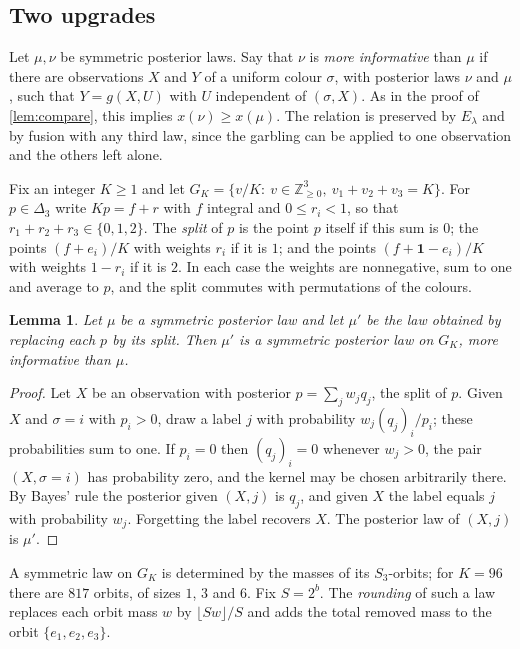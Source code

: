 \documentclass[11pt]{amsart}
\newtheorem{lemma}[theorem]{Lemma}
\theoremstyle{definition}
\theoremstyle{remark}
\newcommand{\one}{\mathbf{1}}
\newcommand{\Simp}{\Delta_3}
\begin{document}
\subsection{Two upgrades}
Let $\mu,\nu$ be symmetric posterior laws. Say that $\nu$ is \emph{more informative} than $\mu$ if there are
observations $X$ and $Y$ of a uniform colour $\sigma$, with posterior laws $\nu$ and $\mu$, such that
$Y=g(X,U)$ with $U$ independent of $(\sigma,X)$. As in the proof of \cref{lem:compare}, this implies
$x(\nu)\ge x(\mu)$. The relation is preserved by $E_\lambda$ and by fusion with any third law, since the garbling
can be applied to one observation and the others left alone.

Fix an integer $K\ge1$ and let $G_K=\{v/K:\ v\in\mathbb Z_{\ge0}^3,\ v_1+v_2+v_3=K\}$. For $p\in\Simp$ write
$Kp=f+r$ with $f$ integral and $0\le r_i<1$, so that $r_1+r_2+r_3\in\{0,1,2\}$. The \emph{split} of $p$ is the
point $p$ itself if this sum is $0$; the points $(f+e_i)/K$ with weights $r_i$ if it is $1$; and the points
$(f+\one-e_i)/K$ with weights $1-r_i$ if it is $2$. In each case the weights are nonnegative, sum to one and
average to $p$, and the split commutes with permutations of the colours.

\begin{lemma}\label{lem:split}
Let $\mu$ be a symmetric posterior law and let $\mu'$ be the law obtained by replacing each $p$ by its split.
Then $\mu'$ is a symmetric posterior law on $G_K$, more informative than $\mu$.
\end{lemma}

\begin{proof}
Let $X$ be an observation with posterior $p=\sum_jw_jq_j$, the split of $p$. Given $X$ and $\sigma=i$ with
$p_i>0$, draw a label $j$ with probability $w_j(q_j)_i/p_i$; these probabilities sum to one. If $p_i=0$ then
$(q_j)_i=0$ whenever $w_j>0$, the pair $(X,\sigma=i)$ has probability zero, and the kernel may be chosen
arbitrarily there. By Bayes' rule the posterior given $(X,j)$ is $q_j$, and given $X$ the label equals $j$ with
probability $w_j$. Forgetting the label recovers $X$. The posterior law of $(X,j)$ is $\mu'$.
\end{proof}

A symmetric law on $G_K$ is determined by the masses of its $S_3$-orbits; for $K=96$ there are $817$ orbits,
of sizes $1$, $3$ and $6$. Fix $S=2^b$. The \emph{rounding} of such a law replaces each orbit mass $w$ by
$\lfloor Sw\rfloor/S$ and adds the total removed mass to the orbit $\{e_1,e_2,e_3\}$.
\end{document}
